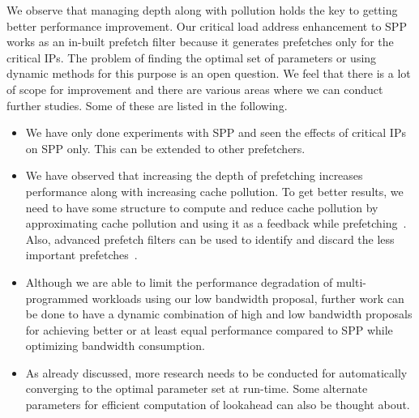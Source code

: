 We observe that managing depth along with pollution holds the key to getting better performance improvement. Our critical load address enhancement to SPP works as an in-built prefetch filter because it generates prefetches only for the critical IPs.
The problem of finding the optimal set of parameters or using dynamic methods for this purpose is an open question. We feel that there is a lot of scope for improvement and there are various areas where we can conduct further studies. Some of these are listed in the following.
 \begin{itemize}
  \item  We have only done experiments with SPP and seen the effects of critical IPs on SPP only. This can be extended to other prefetchers.
  \item We have observed that increasing the depth of prefetching increases performance along with increasing cache pollution. To get better results, we need to have some structure to compute and reduce cache pollution by approximating cache pollution and using it as a feedback while prefetching~\cite{Feedback Directed Prefetching}. Also, advanced prefetch filters can be used to identify and discard the less important prefetches~\cite{Perceptron filtering}.
  \item Although we are able to limit the performance degradation of multi-programmed workloads using our low bandwidth proposal, further work can be done to have a dynamic combination of high and low bandwidth proposals for achieving better or at least equal performance compared to SPP while optimizing bandwidth consumption.
  \item As already discussed, more research needs to be conducted for automatically converging to the optimal parameter set at run-time. Some alternate parameters for efficient computation of lookahead can also be thought about.
\end{itemize}